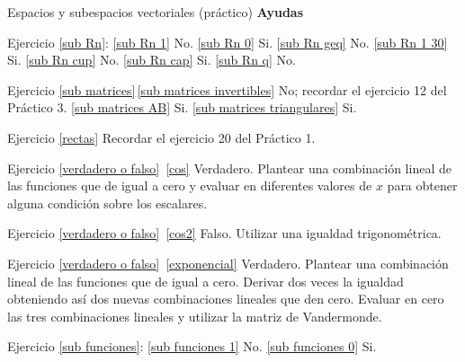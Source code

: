 \begin{chapter}{Espacios y subespacios vectoriales (práctico)}
\textbf{Ayudas}

Ejercicio \ref{sub Rn}: 
\ref{sub Rn 1} No. \ref{sub Rn 0} Si. \ref{sub Rn geq} No. \ref{sub Rn 1 30} Si. \ref{sub Rn cup} No. \ref{sub Rn cap} Si. \ref{sub Rn q} No.


Ejercicio \ref{sub matrices}\,\ref{sub matrices invertibles} No; recordar el ejercicio 12 del Práctico 3. \ref{sub matrices AB} Si. \ref{sub matrices triangulares} Si.

Ejercicio \ref{rectas} Recordar el ejercicio 20 del Práctico 1.

Ejercicio \ref{verdadero o falso}\, \ref{cos} Verdadero. Plantear una combinación lineal de las funciones que de igual a cero y evaluar en diferentes valores de $x$ para obtener alguna condición sobre los escalares.

Ejercicio \ref{verdadero o falso}\, \ref{cos2} Falso. Utilizar una igualdad trigonométrica.

Ejercicio \ref{verdadero o falso}\, \ref{exponencial} Verdadero. Plantear una combinación lineal de las funciones que de igual a cero. Derivar dos veces la igualdad obteniendo así dos nuevas combinaciones lineales que den cero. Evaluar en cero las tres combinaciones lineales y utilizar la matriz de Vandermonde.

Ejercicio \ref{sub funciones}: \ref{sub funciones 1} No. \ref{sub funciones 0} Si.


\end{chapter}